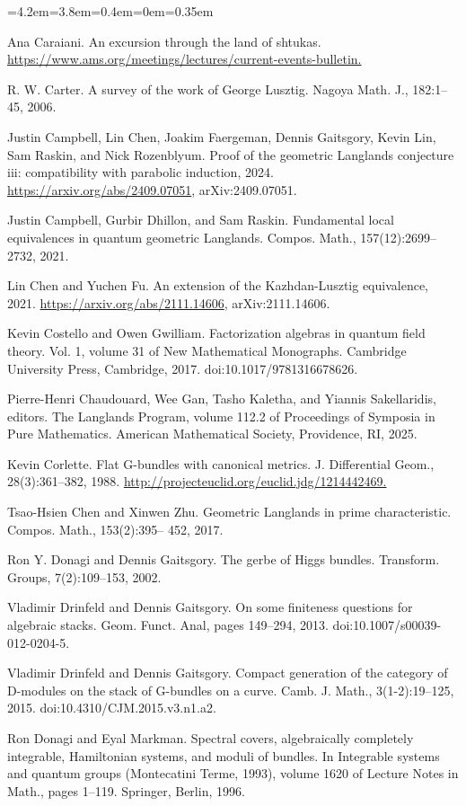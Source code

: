 \begin{list}{}{\leftmargin=4.2em=3.8em=0.4em\itemindent=0em\parsep=0.35em}
\item[{Car}] Ana Caraiani. An excursion through the land of shtukas. \url{https://www.ams.org/meetings/lectures/current-events-bulletin.}
\item[{Car06}] R. W. Carter. A survey of the work of George Lusztig. Nagoya Math. J., 182:1–45, 2006.
\item[{CCF+24}] Justin Campbell, Lin Chen, Joakim Faergeman, Dennis Gaitsgory, Kevin Lin, Sam Raskin, and Nick Rozenblyum. Proof of the geometric Langlands conjecture iii: compatibility with parabolic induction, 2024. \url{https://arxiv.org/abs/2409.07051}, arXiv:2409.07051.
\item[{CDR21}] Justin Campbell, Gurbir Dhillon, and Sam Raskin. Fundamental local equivalences in quantum geometric Langlands. Compos. Math., 157(12):2699–2732, 2021.
\item[{CF21}] Lin Chen and Yuchen Fu. An extension of the Kazhdan-Lusztig equivalence, 2021. \url{https://arxiv.org/abs/2111.14606}, arXiv:2111.14606.
\item[{CG17}] Kevin Costello and Owen Gwilliam. Factorization algebras in quantum field theory. Vol. 1, volume 31 of New Mathematical Monographs. Cambridge University Press, Cambridge, 2017. doi:10.1017/9781316678626.
\item[{CGKS25}] Pierre-Henri Chaudouard, Wee Gan, Tasho Kaletha, and Yiannis Sakellaridis, editors. The Langlands Program, volume 112.2 of Proceedings of Symposia in Pure Mathematics. American Mathematical Society, Providence, RI, 2025.
\item[{Cor88}] Kevin Corlette. Flat G-bundles with canonical metrics. J. Differential Geom., 28(3):361–382, 1988. \url{http://projecteuclid.org/euclid.jdg/1214442469.}
\item[{CZ17}] Tsao-Hsien Chen and Xinwen Zhu. Geometric Langlands in prime characteristic. Compos. Math., 153(2):395– 452, 2017.
\item[{DG02}] Ron Y. Donagi and Dennis Gaitsgory. The gerbe of Higgs bundles. Transform. Groups, 7(2):109–153, 2002.
\item[{DG13}] Vladimir Drinfeld and Dennis Gaitsgory. On some finiteness questions for algebraic stacks. Geom. Funct. Anal, pages 149–294, 2013. doi:10.1007/s00039-012-0204-5.
\item[{DG15}] Vladimir Drinfeld and Dennis Gaitsgory. Compact generation of the category of D-modules on the stack of G-bundles on a curve. Camb. J. Math., 3(1-2):19–125, 2015. doi:10.4310/CJM.2015.v3.n1.a2.
\item[{DM96}] Ron Donagi and Eyal Markman. Spectral covers, algebraically completely integrable, Hamiltonian systems, and moduli of bundles. In Integrable systems and quantum groups (Montecatini Terme, 1993), volume 1620 of Lecture Notes in Math., pages 1–119. Springer, Berlin, 1996.

\end{list}
